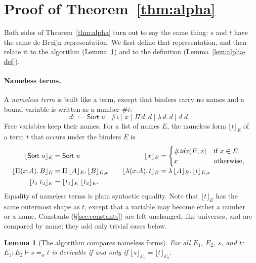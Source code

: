 \documentclass[acmsmall,screen,nonacm]{acmart}
\newtheorem{lemma}[theorem]{Lemma}
\newcommand{\Sort}[1]{\mathsf{Sort}\;#1}
\newcommand{\tPi}[3]{\Pi(#1{:}#2).\,#3}
\newcommand{\tLam}[3]{\lambda(#1{:}#2).\,#3}
\newcommand{\alphaeq}{=_{\alpha}}
\newcommand{\db}[2]{\lfloor #1 \rfloor_{#2}}
\begin{document}
\section{Proof of Theorem~\ref{thm:alpha}}
\label{app:alpha}

Both sides of Theorem~\ref{thm:alpha} turn out to say the same thing: $s$ and $t$ have the same de Bruijn representation.
We first define that representation, and then relate it to the algorithm (Lemma~\ref{lem:alpha-alg}) and to the definition (Lemma~\ref{lem:alpha-def}).

\paragraph{Nameless terms.}
A \emph{nameless term} is built like a term, except that binders carry no names and a bound variable is written as a number $\#i$:
\[
d ::= \Sort{u} \mid \#i \mid x \mid \Pi\,d.\,d \mid \lambda\,d.\,d \mid d\;d
\]
Free variables keep their names.
For a list of names $E$, the nameless form $\db{t}{E}$ of a term $t$ that occurs under the binders $E$ is
\[
\begin{array}{r@{\;}l@{\qquad}r@{\;}l}
\db{\Sort{u}}{E} &= \Sort{u} &
\db{x}{E} &= \begin{cases} \#\mathit{idx}(E, x) & \text{if } x \in E, \\ x & \text{otherwise,} \end{cases} \\[10pt]
\db{\tPi{x}{A}{B}}{E} &= \Pi\,\db{A}{E}.\,\db{B}{E, x} &
\db{\tLam{x}{A}{t}}{E} &= \lambda\,\db{A}{E}.\,\db{t}{E, x} \\[4pt]
\db{t_1\;t_2}{E} &= \db{t_1}{E}\;\db{t_2}{E}.
\end{array}
\]
Equality of nameless terms is plain syntactic equality.
Note that $\db{t}{E}$ has the same outermost shape as $t$, except that a variable may become either a number or a name.
Constants (\S\ref{sec:constants}) are left unchanged, like universes, and are compared by name; they add only trivial cases below.

\begin{lemma}[The algorithm compares nameless forms]
\label{lem:alpha-alg}
For all $E_1$, $E_2$, $s$, and $t$: $E_1; E_2 \vdash s \alphaeq t$ is derivable if and only if $\db{s}{E_1} = \db{t}{E_2}$.
\end{lemma}
\end{document}
